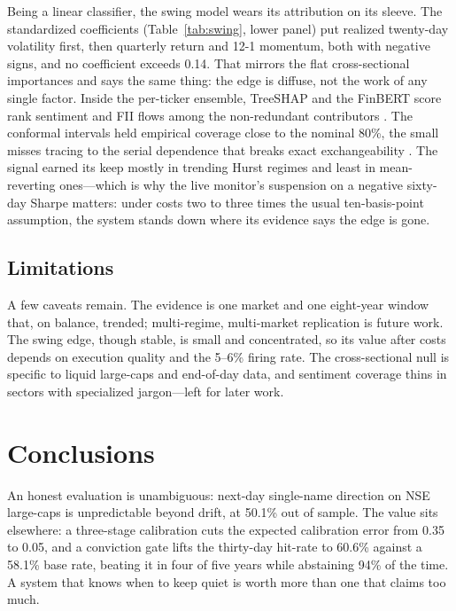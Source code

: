 \documentclass[12pt,a4paper]{article}
\begin{document}
Being a linear classifier, the swing model wears its attribution on its sleeve. The
standardized coefficients (Table~\ref{tab:swing}, lower panel) put realized
twenty-day volatility first, then quarterly return and 12-1 momentum, both with
negative signs, and no coefficient exceeds 0.14. That mirrors the flat
cross-sectional importances and says the same thing: the edge is diffuse, not the
work of any single factor. Inside the per-ticker ensemble, TreeSHAP and the FinBERT
score rank sentiment and FII flows among the non-redundant contributors
\cite{r_nti,r_long}. The conformal intervals held empirical coverage close to the
nominal 80\%, the small misses tracing to the serial dependence that breaks exact
exchangeability \cite{r_angelopoulos}. The signal earned its keep mostly in
trending Hurst regimes and least in mean-reverting ones---which is why the live
monitor's suspension on a negative sixty-day Sharpe matters: under costs two to
three times the usual ten-basis-point assumption, the system stands down where its
evidence says the edge is gone.

\subsection{Limitations}

A few caveats remain. The evidence is one market and one eight-year window that, on
balance, trended; multi-regime, multi-market replication is future work. The swing
edge, though stable, is small and concentrated, so its value after costs depends on
execution quality and the 5--6\% firing rate. The cross-sectional null is specific
to liquid large-caps and end-of-day data, and sentiment coverage thins in sectors
with specialized jargon---left for later work.

\section{Conclusions}

An honest evaluation is unambiguous: next-day single-name direction on NSE
large-caps is unpredictable beyond drift, at 50.1\% out of sample. The value sits
elsewhere: a three-stage calibration cuts the expected calibration error from 0.35
to 0.05, and a conviction gate lifts the thirty-day hit-rate to 60.6\% against a
58.1\% base rate, beating it in four of five years while abstaining 94\% of the
time. A system that knows when to keep quiet is worth more than one that claims too
much.
\end{document}
